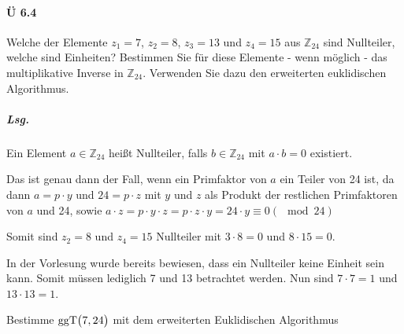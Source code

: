 \documentclass{scrreprt}
\newcommand{\ggT}[0]{\text{ggT}}
\DeclarePairedDelimiter{\floor}{\lfloor}{\rfloor}
\begin{document}
\newpage
\paragraph{Ü 6.4} Welche der Elemente $z_1 = 7$, $z_2 = 8$, $z_3 = 13$ und
$z_4 = 15$ aus $\mathbb{Z}_{24}$ sind Nullteiler, welche sind Einheiten?
Bestimmen Sie für diese Elemente - wenn möglich - das multiplikative Inverse in
$\mathbb{Z}_{24}$.
Verwenden Sie dazu den erweiterten euklidischen Algorithmus.

\subparagraph{Lsg.} Ein Element $a \in \mathbb{Z}_{24}$ heißt Nullteiler, falls
$b \in \mathbb{Z}_{24}$ mit $a \cdot b = 0$ existiert.

Das ist genau dann der Fall, wenn ein Primfaktor von $a$ ein Teiler von 24
ist, da dann $a = p \cdot y$ und $24 = p \cdot z$ mit $y$ und $z$ als
Produkt der restlichen Primfaktoren von $a$ und 24, sowie
$a \cdot z = p \cdot y \cdot z = p \cdot z \cdot y = 24 \cdot y \equiv 0 (\mod 24)$

Somit sind $z_2 = 8$ und $z_4 = 15$ Nullteiler mit $3 \cdot 8 = 0$ und
$8 \cdot 15 = 0$.

In der Vorlesung wurde bereits bewiesen, dass ein Nullteiler keine Einheit sein
kann.
Somit müssen lediglich 7 und 13 betrachtet werden.
Nun sind $7 \cdot 7 = 1$ und $13 \cdot 13 = 1$.

Bestimme $\ggT\qty\big(7, 24)$ mit dem erweiterten Euklidischen Algorithmus

\end{document}
